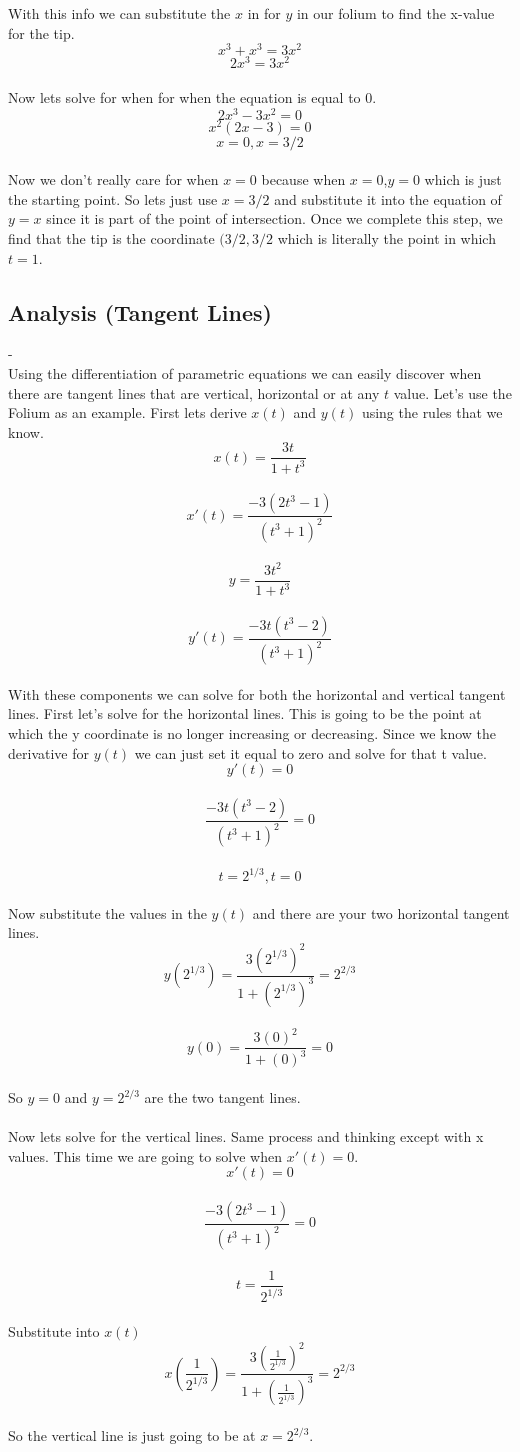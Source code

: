 \documentclass[a4paper,openright, 14pt]{article}
\begin{document}
With this info we can substitute the $x$ in for $y$ in our folium to find the x-value for the tip. 
$$x^3 + x^3=3x^2$$
$$2x^3=3x^2$$\\
Now lets solve for when for when the equation is equal to 0.
$$2x^3-3x^2=0$$
$$x^2 (2x-3)=0$$
$$x=0,x=3/2$$\\
Now we don't really care for when $x=0$ because when $x=0$,$y=0$ which is just the starting point. So lets just use $x=3/2$ and substitute it into the equation of $y=x$ since it is part of the point of intersection. Once we complete this step, we find that the tip is the coordinate $(3/2,3/2$ which is literally the point in which $t=1$.
\subsection*{Analysis (Tangent Lines)}
-\\

Using the differentiation of parametric equations we can easily discover when there are tangent lines that are vertical, horizontal or at any $t$ value. Let's use the Folium as an example. First lets derive $x(t)$ and $y(t)$ using the rules that we know.
$$x(t)=\frac{3t}{1+t^3}$$\\
$$x'(t)=\frac{-3(2t^3 -1)}{(t^3 +1)^2}$$\\
$$y=\frac{3t^2}{1+t^3}$$\\
$$y'(t)=\frac{-3t(t^3 -2)}{(t^3 +1)^2}$$\\
With these components we can solve for both the horizontal and vertical tangent lines. First let's solve for the horizontal lines. This is going to be the point at which the y coordinate is no longer increasing or decreasing. Since we know the derivative for $y(t)$ we can just set it equal to zero and solve for that t value.
$$y'(t)=0$$\\
$$\frac{-3t(t^3 -2)}{(t^3 +1)^2}=0$$\\
$$t=2^{1/3},t=0$$\\
Now substitute the values in the $y(t)$ and there are your two horizontal tangent lines.
$$y(2^{1/3})=\frac{3(2^{1/3})^2}{1+(2^{1/3})^3}=2^{2/3}$$\\
$$y(0)=\frac{3(0)^2}{1+(0)^3}=0$$\\
So $y=0$ and $y=2^{2/3}$ are the two tangent lines.\\\\
Now lets solve for the vertical lines. Same process and thinking except with x values. This time we are going to solve when $x'(t)=0$.
$$x'(t)=0$$\\
$$\frac{-3(2t^3 -1)}{(t^3 +1)^2}=0$$\\
$$t=\frac{1}{2^{1/3}}$$\\
Substitute into $x(t)$
$$x(\frac{1}{2^{1/3}})=\frac{3(\frac{1}{2^{1/3}})^2}{1+(\frac{1}{2^{1/3}})^3}=2^{2/3}$$\\
So the vertical line is just going to be at $x=2^{2/3}$.\\
\end{document}

